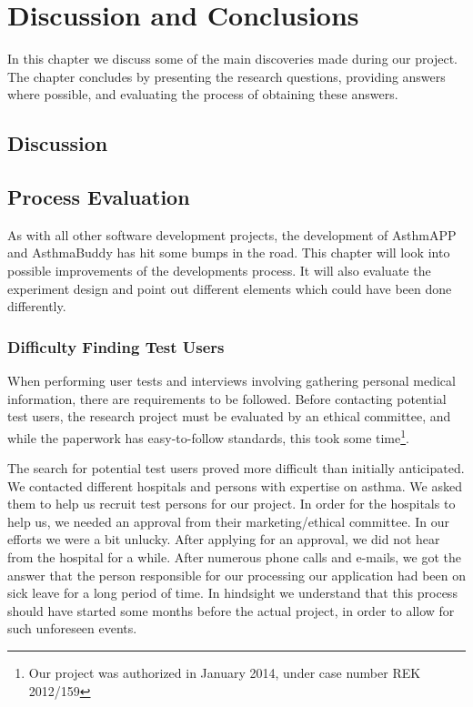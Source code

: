 \chapter{Discussion and Conclusions}
\label{chp:masterconclusion}

In this chapter we discuss some of the main discoveries made during our project. The chapter concludes by presenting the research questions, providing answers where possible, and evaluating the process of obtaining these answers. 

\section{Discussion}
\label{sec:discussion}




\section{Process Evaluation}
\label{sec:processevaluation}
As with all other software development projects, the development of AsthmAPP and AsthmaBuddy has hit some bumps in the road. This chapter will look into possible improvements of the developments process. It will also evaluate the experiment design and point out different elements which could have been done differently.

\subsection{Difficulty Finding Test Users}
\label{sec:difficultyfindingtestusers}
When performing user tests and interviews involving gathering personal medical information, there are requirements to be followed. Before contacting potential test users, the research project must be evaluated by an ethical committee, and while the paperwork has easy-to-follow standards, this took some time\footnote{Our project was authorized in January 2014, under case number REK 2012/159}. 

The search for potential test users proved more difficult than initially anticipated. We contacted different hospitals and persons with expertise on asthma. We asked them to help us recruit test persons for our project. In order for the hospitals to help us, we needed an approval from their marketing/ethical committee. In our efforts we were a bit unlucky. After applying for an approval, we did not hear from the hospital for a while. After numerous phone calls and e-mails, we got the answer that the person responsible for our processing our application had been on sick leave for a long period of time. In hindsight we understand that this process should have started some months before the actual project, in order to allow for such unforeseen events. 

